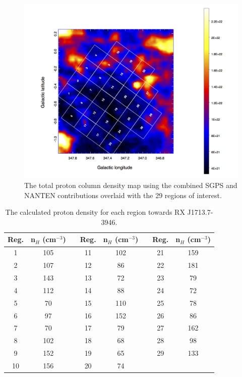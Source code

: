 \documentclass[12pt,a4paper]{article}
\begin{document}
\begin{figure}[H]
	\centering
	\includegraphics[width=0.8\linewidth, height=0.4\textheight]{sgps+nanten_regmap}
	\caption{The total proton column density map using the combined SGPS and NANTEN contributions overlaid with the 29 regions of interest.}
	\label{fig:rxj1713Nproton}
\end{figure}
\begin{table}[H] 
	\begin{center}
		\begin{tabular}{cccccccc}
			\toprule
			Reg. & n$_H$ (cm$^{-3}$) && Reg. & n$_H$ (cm$^{-3}$) && Reg. & n$_H$ (cm$^{-3}$) \\ 
			\hline 
			1& 105 && 11 & 102  && 21 & 159   \\ 
			2& 107 && 12 & 86  && 22 & 181   \\ 
			3& 143 && 13 & 72  && 23 & 79  \\ 
			4& 112 && 14 & 88  && 24 & 72  \\ 
			5& 70 && 15 & 110 && 25 & 78   \\ 
			6& 97 && 16 & 152  && 26 & 86   \\ 
			7& 70 && 17 & 79  && 27 & 162   \\ 
			8& 102 && 18 & 68  && 28 & 98   \\ 
			9& 152 && 19 & 65  && 29 & 133   \\ 
			10& 156 && 20 & 74  && & \\ 
			\bottomrule
		\end{tabular} 
	\end{center}
	\caption{The calculated proton density for each region towards RX J1713.7-3946.}
	\label{tab:atcaobvs}
\end{table}
\end{document}
